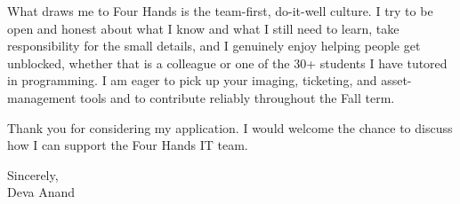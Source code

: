 \documentclass[letterpaper,11pt]{article}
\begin{document}
What draws me to Four Hands is the team-first, do-it-well culture. I try to be open and honest about what I know and what I still need to learn, take responsibility for the small details, and I genuinely enjoy helping people get unblocked, whether that is a colleague or one of the 30+ students I have tutored in programming. I am eager to pick up your imaging, ticketing, and asset-management tools and to contribute reliably throughout the Fall term.

Thank you for considering my application. I would welcome the chance to discuss how I can support the Four Hands IT team.

\vspace{6pt}

\noindent Sincerely,\\
Deva Anand
\end{document}
